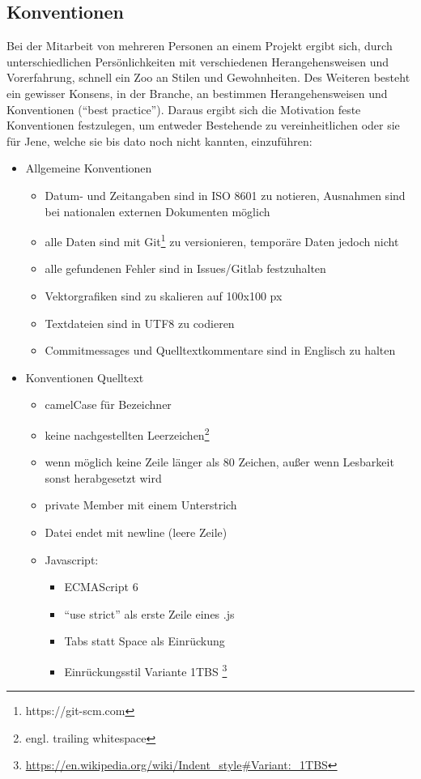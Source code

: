 \subsection{Konventionen}
Bei der Mitarbeit von mehreren Personen an einem Projekt ergibt sich, durch unterschiedlichen Persönlichkeiten mit verschiedenen Herangehensweisen und Vorerfahrung, schnell ein Zoo an Stilen und Gewohnheiten. Des Weiteren besteht ein gewisser Konsens, in der Branche, an bestimmen Herangehensweisen und Konventionen ("`best practice"'). Daraus ergibt sich die Motivation feste Konventionen festzulegen, um entweder Bestehende zu vereinheitlichen oder sie für Jene, welche sie bis dato noch nicht kannten, einzuführen:
\begin{itemize}
\item Allgemeine Konventionen
	\begin{itemize}
	\item Datum- und Zeitangaben sind in ISO 8601 zu notieren, Ausnahmen sind bei nationalen externen Dokumenten möglich
	\item alle Daten sind mit Git\footnote{https://git-scm.com} zu versionieren, temporäre Daten jedoch nicht
	\item alle gefundenen Fehler sind in Issues/Gitlab festzuhalten
	\item Vektorgrafiken sind zu skalieren auf 100x100 px
	\item Textdateien sind in UTF8 zu codieren
	\item Commitmessages und Quelltextkommentare sind in Englisch zu halten
	\end{itemize}
\item Konventionen Quelltext
	\begin{itemize}
	\item camelCase für Bezeichner
	\item keine nachgestellten Leerzeichen\footnote{engl. trailing whitespace}
	\item wenn möglich keine Zeile länger als 80 Zeichen, außer wenn Lesbarkeit sonst herabgesetzt wird
	\item private Member mit einem Unterstrich
	\item Datei endet mit newline (leere Zeile)
	\item Javascript:
		\begin{itemize}
		\item ECMAScript 6
		\item "`use strict"' als erste Zeile eines .js
		\item Tabs statt Space als Einrückung
		\item Einrückungsstil Variante 1TBS \footnote{\url{https://en.wikipedia.org/wiki/Indent_style\#Variant:_1TBS}}
		\end{itemize}
	\end{itemize}
\end{itemize}


